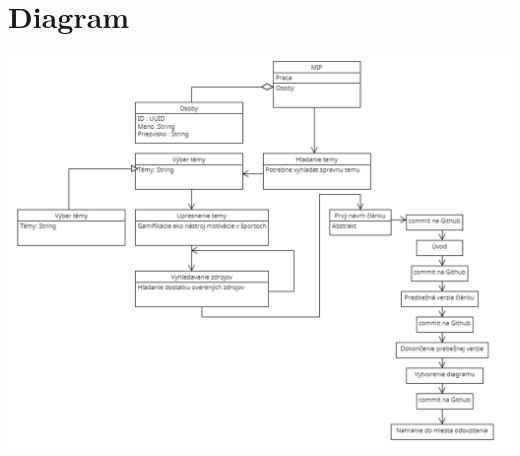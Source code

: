 \documentclass[10pt,twoside,slovak,a4paper]{article}
\begin{document}
\section{Diagram}
\includegraphics[scale =0.6]{diagram.png}



\end{document}
